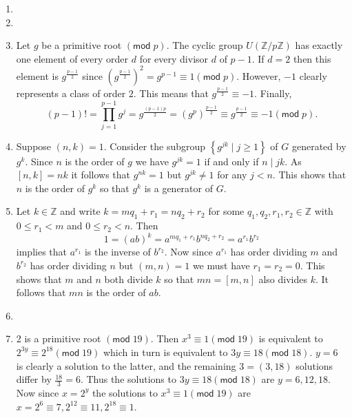 \documentclass[12pt]{article}
\renewcommand{\pmod}[1]{\left(\mathsf{mod}\;#1\right)}
\begin{document}
\begin{enumerate}
\item %
\item %
\item Let $g$ be a primitive root $\pmod{p}$.
The cyclic group $U\left(\mathbb{Z}/p\mathbb{Z}\right)$
has exactly one element of every order $d$ for every divisor
$d$ of $p-1$. If $d=2$ then this element is $g^{\frac{p-1}{2}}$
since $\left(g^{\frac{p-1}{2}}\right)^2=g^{p-1}\equiv 1\pmod{p}$.
However, $-1$ clearly represents a class of order $2$.
This means that $g^{\frac{p-1}{2}}\equiv -1$.
Finally,
\[\left(p-1\right)!=\prod_{j=1}^{p-1}g^j
=g^{\frac{\left(p-1\right)p}{2}}
=\left(g^p\right)^{\frac{p-1}{2}}
\equiv g^{\frac{p-1}{2}}
\equiv -1\pmod{p}.\]

\item\label{CyclicGenerators} %
Suppose $\left(n,k\right)=1$.
Consider the subgroup 
$\left\{g^{jk}\mid j\ge 1\right\}$
of $G$ generated by $g^k$.
Since $n$ is the order of $g$ we have $g^{jk}=1$
if and only if $n\mid jk$. As $\left[n,k\right]=nk$
it follows that $g^{nk}=1$ but $g^{jk}\ne 1$ for any $j<n$.
This shows that $n$ is the order of $g^k$
so that $g^k$ is a generator of $G$.

\item %
Let $k\in\mathbb{Z}$ and write $k=mq_1+r_1=nq_2+r_2$ for
some $q_1,q_2,r_1,r_2\in\mathbb{Z}$ with $0\le r_1<m$ and $0\le r_2<n$. Then 
\[1=\left(ab\right)^k=a^{mq_1+r_1}b^{nq_2+r_2}=a^{r_1}b^{r_2}\]
implies that $a^{r_1}$ is the inverse of $b^{r_2}$.
Now since $a^{r_1}$ has order dividing $m$ and $b^{r_2}$
has order dividing $n$ but $\left(m,n\right)=1$ we must
have $r_1=r_2=0$. This shows that $m$ and $n$ both divide $k$
so that $mn=\left[m,n\right]$ also divides $k$. It follows
that $mn$ is the order of $ab$.

\item %

\item %
2 is a primitive root $\pmod{19}$. Then $x^3\equiv 1\pmod{19}$
is equivalent to $2^{3y}\equiv 2^{18}\pmod{19}$
which in turn is equivalent to $3y\equiv 18\pmod{18}$.
$y=6$ is clearly a solution to the latter, and the remaining
$3=\left(3,18\right)$ solutions differ by $\frac{18}{3}=6$.
Thus the solutions to $3y\equiv 18\pmod{18}$ are $y=6,12,18$.
Now since $x=2^y$ the solutions to $x^3\equiv 1\pmod{19}$
are $x=2^6\equiv 7,
2^{12}\equiv 11,2^{18}\equiv 1$. 
\end{enumerate}
\end{document}
